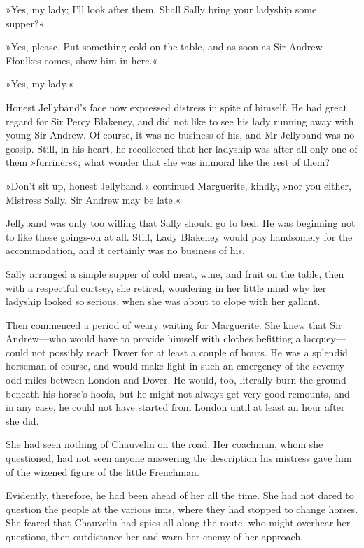 »Yes, my lady; I'll look after them. Shall Sally bring your ladyship some supper?«

»Yes, please. Put something cold on the table, and as soon as Sir Andrew Ffoulkes comes, show him in here.«

»Yes, my lady.«

Honest Jellyband's face now expressed distress in spite of himself. He had great regard for Sir Percy Blakeney, and did not like to see his lady running away with young Sir Andrew. Of course, it was no business of his, and Mr Jellyband was no gossip. Still, in his heart, he recollected that her ladyship was after all only one of them »furriners«; what wonder that she was immoral like the rest of them?

»Don't sit up, honest Jellyband,« continued Marguerite, kindly, »nor you either, Mistress Sally. Sir Andrew may be late.«

Jellyband was only too willing that Sally should go to bed. He was beginning not to like these goings-on at all. Still, Lady Blakeney would pay handsomely for the accommodation, and it certainly was no business of his.

Sally arranged a simple supper of cold meat, wine, and fruit on the table, then with a respectful curtsey, she retired, wondering in her little mind why her ladyship looked so serious, when she was about to elope with her gallant.

Then commenced a period of weary waiting for Marguerite. She knew that Sir Andrew—who would have to provide himself with clothes befitting a lacquey—could not possibly reach Dover for at least a couple of hours. He was a splendid horseman of course, and would make light in such an emergency of the seventy odd miles between London and Dover. He would, too, literally burn the ground beneath his horse's hoofs, but he might not always get very good remounts, and in any case, he could not have started from London until at least an hour after she did.

She had seen nothing of Chauvelin on the road. Her coachman, whom she questioned, had not seen anyone answering the description his mistress gave him of the wizened figure of the little Frenchman.

Evidently, therefore, he had been ahead of her all the time. She had not dared to question the people at the various inns, where they had stopped to change horses. She feared that Chauvelin had spies all along the route, who might overhear her questions, then outdistance her and warn her enemy of her approach.

